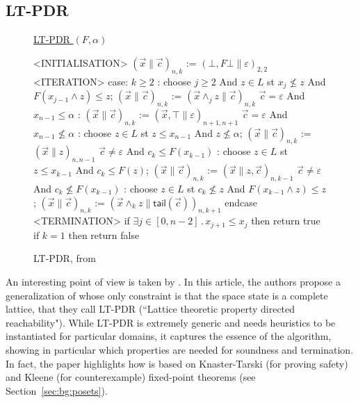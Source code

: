 \subsection{LT-PDR}\label{sec:sota:lt-pdr}
\begin{figure}[t]
	\begin{center}
		\underline{{LT-PDR} $(F,\alpha)$}
		{\small
			\begin{codeNT}
<INITIALISATION>
  $( \vec{x} \| \vec{c} )_{n,k}$ := $(\bot, F \bot \| \varepsilon)_{2,2}$
<ITERATION>						            %
  case:
       $k \ge 2$ :               	         	%
			choose $j \ge 2$ And $z \in L$ st $x_{j} \nleq z$ And $F(x_{j-1} \land z) \leq z$;
			$(\vec{x} \| \vec{c} )_{n,k}$ := $(\vec{x} \land_j z \| \vec{c} )_{n,k}$
       $\vec{c}=\varepsilon$ And $x_{n-1} \leq \alpha$     :                    %
			$( \vec{x} \| \vec{c} )_{n,k}$ := $( \vec{x}, \top \| \varepsilon )_{n+1,n+1}$
       $\vec{c}=\varepsilon$ And $x_{n-1} \nleq \alpha$    :                     %
			choose $z \in L$ st $z \le x_{n-1}$ And $z \nleq \alpha$;
			$( \vec{x} \| \vec{c} )_{n,k}$ := $( \vec{x} \| z )_{n,n-1}$
       $\vec{c} \neq \varepsilon$ And $c_k \le F(x_{k-1})$ :                        %
			choose $z \in L$ st $z \le x_{k-1}$ And $c_{k} \le F(z)$;
			$( \vec{x} \| \vec{c} )_{n,k}$ := $(\vec{x} \| z , \vec{c} )_{n,k-1}$
       $\vec{c} \neq \varepsilon$ And $c_{k} \nleq F(x_{k-1})$ :                        %
			choose $z \in L$ st $c_k \nleq z$ And $F(x_{k-1} \land z) \le z$;
			$( \vec{x} \| \vec{c} )_{n,k}$ := $(\vec{x} \land_k z \| \mathsf{tail}(\vec{c}) )_{n,k+1}$
  endcase
<TERMINATION>
  if $\exists j\in [0,n-2]\,.\, x_{j+1} \leq x_j$ then return true		 %
  if $k = 1$ then return false						 %
\end{codeNT}
		}
	\end{center}
	\caption{LT-PDR, from~\cite{KUKSH22}}\label{fig:sota:lt-pdr}
\end{figure}
An interesting point of view is taken by \cite{KUKSH22}. In this article, the authors propose a generalization of  whose only constraint is that the space state is a complete lattice, that they call LT-PDR (``Lattice theoretic property directed reachability"). While LT-PDR is extremely generic and needs heuristics to be instantiated for particular domains, it captures the essence of the algorithm, showing in particular which properties are needed for soundness and termination. In fact, the paper highlights how  is based on Knaster-Tarski (for proving safety) and Kleene (for counterexample) fixed-point theorems (see Section~\ref{sec:bg:posets}).
